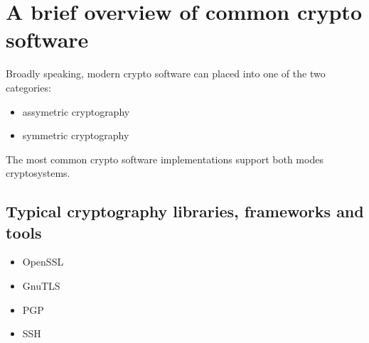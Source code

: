 \section{A brief overview of common crypto software}

Broadly speaking, modern crypto software can placed into one of the two categories:

\begin{itemize}
\item assymetric cryptography 
\item symmetric cryptography
\end{itemize}

The most common crypto software implementations support both modes cryptosystems.

\subsection{Typical cryptography libraries, frameworks and tools}

\begin{itemize}
\item OpenSSL
\item GnuTLS
\item PGP
\item SSH
\end{itemize}





